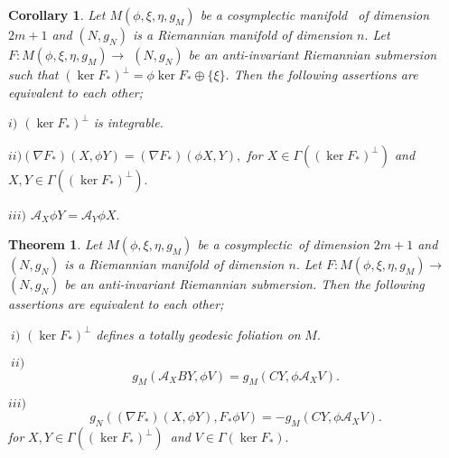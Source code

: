 \documentclass{amsart}
\newtheorem{theorem}{Theorem}
\theoremstyle{plain}
\newtheorem{corollary}{Corollary}
\numberwithin{equation}{section}
\begin{document}
\begin{corollary}
Let $M(\phi ,\xi ,\eta ,g_{M})$ be a cosymplectic manifold \ of dimension $2m+1$ and $(N,g_{N})$ is a Riemannian manifold of dimension $n.$ Let $F:M(\phi ,\xi ,\eta ,g_{M})\rightarrow $ $(N,g_{N})$ be an anti-invariant
Riemannian submersion such that $(\ker F_{\ast })^{\bot }=\phi \ker F_{\ast
}\oplus \{\xi \}.$ Then the following assertions are equivalent to each
other;

$i)$ $(\ker F_{\ast })^{\bot }$ \textit{is integrable.}

$ii)(\nabla F_{\ast })(X,\phi Y)=(\nabla F_{\ast })(\phi X,Y),$ for $X\in
\Gamma ((\ker F_{\ast })^{\bot })$ and $X,Y\in \Gamma ((\ker F_{\ast
})^{\bot }).$

$iii)$ $\mathcal{A}_{X}\phi Y=\mathcal{A}_{Y}\phi X.$
\end{corollary}

\begin{theorem}
Let $M(\phi ,\xi ,\eta ,g_{M})$ be a cosymplectic\ of dimension $2m+1$ and $(N,g_{N})$ is a Riemannian manifold of dimension $n.$ Let $F:M(\phi ,\xi
,\eta ,g_{M})\rightarrow $ $(N,g_{N})$ be an anti-invariant Riemannian
submersion. Then the following assertions are equivalent to each other;
\end{theorem}

$\ i)$ $(\ker F_{\ast })^{\bot }$ \textit{defines a totally geodesic
foliation on }$M.$

$\ ii)$ 
\begin{equation*}
g_{M}(\mathcal{A}_{X}BY,\phi V)=g_{M}(CY,\phi \mathcal{A}_{X}V).
\end{equation*}

$iii)$\begin{equation*}
g_{N}((\nabla F_{\ast })(X,\phi Y),F_{\ast }\phi V)=-g_{M}(CY,\phi \mathcal{A}_{X}V).
\end{equation*}\textit{for }$X,Y\in \Gamma ((\ker F_{\ast })^{\bot })$\textit{\ and }$V\in
\Gamma (\ker F_{\ast })$.
\end{document}

